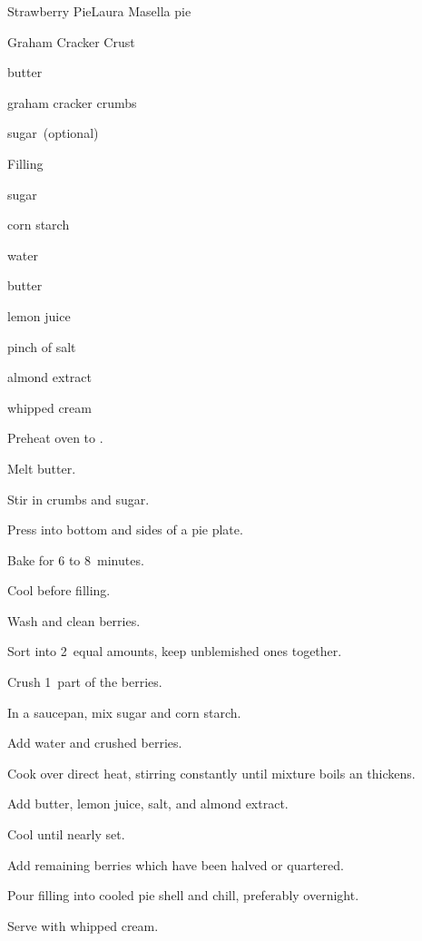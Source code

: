 \begin{recipe}{Strawberry Pie}{Laura Masella}{ pie}

Graham Cracker Crust
\begin{ingredients}
\item \C{\third} butter
\item \C{1\third} graham cracker crumbs
\item \C{\quarter} sugar~(optional)
\end{ingredients}
 
Filling
\begin{ingredients}
\item {} sugar
\item {} corn starch
\item {} 
\item \C{\half} water
\item {} butter
\item {} lemon juice
\item pinch of salt
\item {} almond extract
\item whipped cream
\end{ingredients}
 
\begin{directions}
\item Preheat oven to .
\item Melt butter.
\item Stir in crumbs and sugar.
\item Press into bottom and sides of a  pie plate.
\item Bake for 6 to 8~minutes.
\item Cool before filling.
\item Wash and clean berries.
\item Sort into 2~equal amounts, keep unblemished ones together.
\item Crush 1~part of the berries.
\item In a saucepan, mix sugar and corn starch.
\item Add water and crushed berries.
\item Cook over direct heat, stirring constantly until mixture boils an thickens.
\item Add butter, lemon juice, salt, and almond extract.
\item Cool until nearly set.
\item Add remaining berries which have been halved or quartered.
\item Pour filling into cooled pie shell and chill, preferably overnight.
\item Serve with whipped cream.
\end{directions}

\end{recipe}
